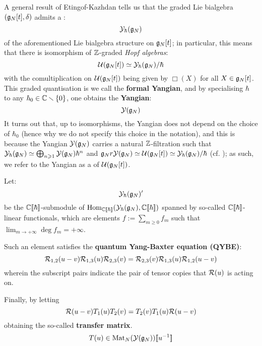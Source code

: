         A general result of Etingof-Kazhdan tells us that the graded Lie bialgebra $(\mathfrak{g}_N[t], \delta)$ admits a :
            $$\mathcal{Y}_{\hbar}(\mathfrak{g}_N)$$
        of the aforementioned Lie bialgebra structure on $\mathfrak{g}_N[t]$; in particular, this means that there is isomorphism of $\mathbb{Z}$-graded \textit{Hopf algebras}:
            $$\mathcal{U}(\mathfrak{g}_N[t]) \simeq \mathcal{Y}_{\hbar}(\mathfrak{g}_N)/\hbar$$
        with the comultiplication on $\mathcal{U}(\mathfrak{g}_N[t])$ being given by $\Box(X)$ for all $X \in \mathfrak{g}_N[t]$. This graded quantisation is we call the \textbf{formal Yangian}, and by specialising $\hbar$ to any $\hbar_0 \in \mathbb{C} \smallsetminus \{0\}$, one obtains the \textbf{Yangian}:
            $$\mathcal{Y}(\mathfrak{g}_N)$$
        It turns out that, up to isomorphisms, the Yangian does not depend on the choice of $\hbar_0$ (hence why we do not specify this choice in the notation), and this is because the Yangian $\mathcal{Y}(\mathfrak{g}_N)$ carries a natural $\mathbb{Z}$-filtration such that $\mathcal{Y}_{\hbar}(\mathfrak{g}_N) \simeq \bigoplus_{n \geqslant 1} \mathcal{Y}(\mathfrak{g}_N) \hbar^n$ and $\mathfrak{g}_Nr \mathcal{Y}(\mathfrak{g}_N) \simeq \mathcal{U}(\mathfrak{g}_N[t]) \simeq \mathcal{Y}_{\hbar}(\mathfrak{g}_N)/\hbar$ (cf. \cite{drinfeld_original_yangian_paper}); as such, we refer to the Yangian as a  of $\mathcal{U}(\mathfrak{g}_N[t])$.

        Let:
            $$\mathcal{Y}_{\hbar}(\mathfrak{g}_N)'$$
        be the $\mathbb{C}[\![\hbar]\!]$-submodule of $\operatorname{Hom}_{\mathbb{C}[\![\hbar]\!]}( \mathcal{Y}_{\hbar}(\mathfrak{g}_N), \mathbb{C}[\![\hbar]\!] )$ spanned by so-called  $\mathbb{C}[\![\hbar]\!]$-linear functionals, which are elements $f := \sum_{m \geq 0} f_m$ such that $\lim_{m \to +\infty} \deg f_m = +\infty$.
            
        Such an element satisfies the \textbf{quantum Yang-Baxter equation (QYBE)}:
            \begin{equation} \label{equation: additive_spectral_QYBE}
                \mathcal{R}_{1, 2}(u - v) \mathcal{R}_{1, 3}(u) \mathcal{R}_{2, 3}(v) = \mathcal{R}_{2, 3}(v) \mathcal{R}_{1, 3}(u) \mathcal{R}_{1, 2}(u - v)
            \end{equation}
        wherein the subscript pairs indicate the pair of tensor copies that $\mathcal{R}(u)$ is acting on.

        Finally, by letting 
            \begin{equation} \label{equation: RTT_relation}
                \mathcal{R}(u - v) T_1(u) T_2(v) = T_2(v) T_1(u) \mathcal{R}(u - v)
            \end{equation}
        obtaining the so-called \textbf{transfer matrix}.
            $$T(u) \in \operatorname{Mat}_N( \mathcal{Y}(\mathfrak{g}_N) )[\![u^{-1}]\!]$$
    
